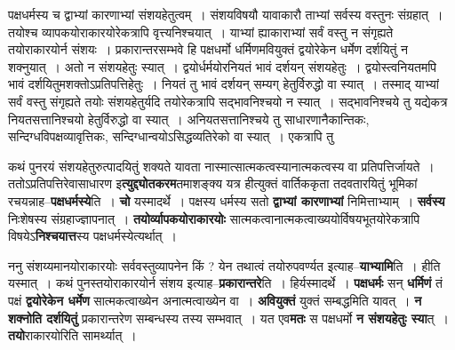 \documentclass[article,12pt,a4paper]{memoir}
\begin{document}
	  \pstart पक्षधर्मस्य च द्वाभ्यां कारणाभ्यां संशयहेतुत्वम् । संशयविषयौ यावाकारौ ताभ्यां सर्वस्य वस्तुनः संग्रहात् । तयोश्च व्यापकयोराकारयोरेकत्रापि वृत्त्यनिश्चयात् । याभ्यां ह्याकाराभ्यां सर्वं वस्तु न संगृह्यते तयोराकारयोर्न संशयः । प्रकारान्तरसम्भवे हि पक्षधर्मो धर्मिणमवियुक्तं द्वयोरेकेन धर्मेण दर्शयितुं न शक्नुयात् । अतो न संशयहेतुः स्यात् । द्वयोर्धर्मयोरनियतं भावं दर्शयन् संशयहेतुः । द्वयोस्त्वनियतमपि भावं दर्शयितुमशक्तोऽप्रतिपत्तिहेतुः । नियतं तु भावं दर्शयन् सम्यग् हेतुर्विरुद्धो वा स्यात् । तस्माद् याभ्यां सर्वं वस्तु संगृह्यते तयोः संशयहेतुर्यदि तयोरेकत्रापि सद्भावनिश्चयो न स्यात् । सद्भावनिश्चये तु यद्येकत्र नियतसत्तानिश्चयो हेतुर्विरुद्धो वा स्यात् । अनियतसत्तानिश्चये तु साधारणानैकान्तिकः, सन्दिग्धविपक्षव्यावृत्तिकः, सन्दिग्धान्वयोऽसिद्धव्यतिरेको वा स्यात् । एकत्रापि तु
	\pend
      
	  \endgroup
	

	  \pstart कथं पुनरयं संशयहेतुरुत्पादयितुं शक्यते यावता नास्मात्सात्मकत्वस्यानात्मकत्वस्य वा प्रतिपत्तिर्जायते । ततोऽप्रतिपत्तिरेवासाधारण इ\textbf{त्युद्द्योतकरम}तमाशङ्क्य यत्र  हीत्युक्तं वार्तिककृता तदवतारयितुं भूमिकां रचयन्नाह--\textbf{पक्षधर्मस्ये}ति । \textbf{चो} यस्मादर्थे । पक्षस्य धर्मस्य सतो \textbf{द्वाभ्यां कारणाभ्यां} निमित्ताभ्याम् । \textbf{सर्वस्य} निःशेषस्य संग्रहाज्ज्ञापनात् । \textbf{तयोर्व्यापकयोराकारयोः} सात्मकत्वानात्मकत्वाख्ययोर्विषयभूतयोरेकत्रापि विषयेऽ\textbf{निश्चयात्त}स्य पक्षधर्मस्येत्यर्थात् ।
	\pend
      

	  \pstart ननु संशय्यमानयोराकारयोः सर्ववस्तुव्यापनेन किं ? येन तथात्वं तयोरुपवर्ण्यत इत्याह--\textbf{याभ्यामि}ति । हीति यस्मात् । कथं पुनस्तयोराकारयोर्न संशय इत्याह--\textbf{प्रकारान्तरे}ति । हिर्यस्मादर्थे । \textbf{पक्षधर्मः} सन् \textbf{धर्मिणं} तं पक्षं \textbf{द्वयोरेकेन धर्मेण} सात्मकत्वाख्येन अनात्मत्वाख्येन वा । \textbf{अवियुक्तं} युक्तं सम्बद्धमिति यावत् । \textbf{न शक्नोति दर्शयितुं} प्रकारान्तरेण सम्बन्धस्य तस्य सम्भवात् । यत एव\textbf{मतः} स पक्षधर्मो \textbf{न संशयहेतुः स्या}त् । \textbf{तयो}राकारयोरिति सामर्थ्यात् ।
	\pend
      
\end{document}
